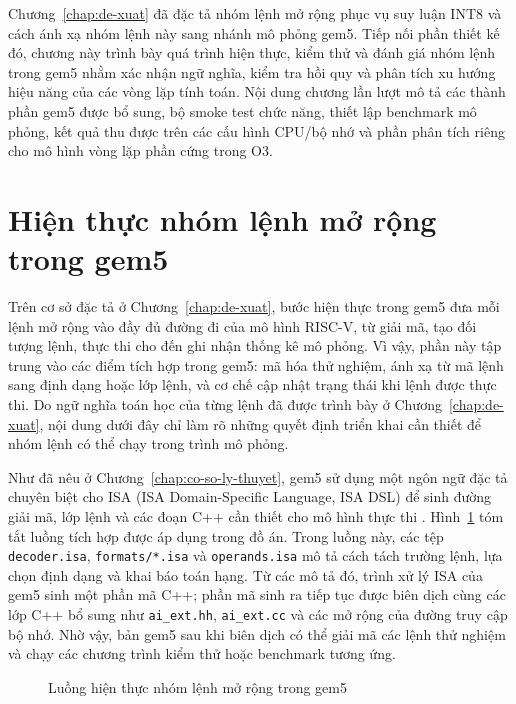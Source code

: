 \documentclass[../DoAn.tex]{subfiles}
\begin{document}
Chương~\ref{chap:de-xuat} đã đặc tả nhóm lệnh mở rộng phục vụ suy luận INT8 và cách ánh xạ nhóm lệnh này sang nhánh mô phỏng gem5. Tiếp nối phần thiết kế đó, chương này trình bày quá trình hiện thực, kiểm thử và đánh giá nhóm lệnh trong gem5 nhằm xác nhận ngữ nghĩa, kiểm tra hồi quy và phân tích xu hướng hiệu năng của các vòng lặp tính toán. Nội dung chương lần lượt mô tả các thành phần gem5 được bổ sung, bộ smoke test chức năng, thiết lập benchmark mô phỏng, kết quả thu được trên các cấu hình CPU/bộ nhớ và phần phân tích riêng cho mô hình vòng lặp phần cứng trong O3.

\section{Hiện thực nhóm lệnh mở rộng trong gem5}
\label{sec:hien-thuc-gem5}

Trên cơ sở đặc tả ở Chương~\ref{chap:de-xuat}, bước hiện thực trong gem5 đưa mỗi lệnh mở rộng vào đầy đủ đường đi của mô hình RISC-V, từ giải mã, tạo đối tượng lệnh, thực thi cho đến ghi nhận thống kê mô phỏng. Vì vậy, phần này tập trung vào các điểm tích hợp trong gem5: mã hóa thử nghiệm, ánh xạ từ mã lệnh sang định dạng hoặc lớp lệnh, và cơ chế cập nhật trạng thái khi lệnh được thực thi. Do ngữ nghĩa toán học của từng lệnh đã được trình bày ở Chương~\ref{chap:de-xuat}, nội dung dưới đây chỉ làm rõ những quyết định triển khai cần thiết để nhóm lệnh có thể chạy trong trình mô phỏng.

Như đã nêu ở Chương~\ref{chap:co-so-ly-thuyet}, gem5 sử dụng một ngôn ngữ đặc tả chuyên biệt cho ISA (ISA Domain-Specific Language, ISA DSL) để sinh đường giải mã, lớp lệnh và các đoạn C++ cần thiết cho mô hình thực thi \cite{gem5_docs_2026}. Hình~\ref{fig:gem5-ai-ext-implementation} tóm tắt luồng tích hợp được áp dụng trong đồ án. Trong luồng này, các tệp \texttt{decoder.isa}, \texttt{formats/*.isa} và \texttt{operands.isa} mô tả cách tách trường lệnh, lựa chọn định dạng và khai báo toán hạng. Từ các mô tả đó, trình xử lý ISA của gem5 sinh một phần mã C++; phần mã sinh ra tiếp tục được biên dịch cùng các lớp C++ bổ sung như \texttt{ai\_ext.hh}, \texttt{ai\_ext.cc} và các mở rộng của đường truy cập bộ nhớ. Nhờ vậy, bản gem5 sau khi biên dịch có thể giải mã các lệnh thử nghiệm và chạy các chương trình kiểm thử hoặc benchmark tương ứng.

\begin{figure}[H]
    \centering
    
    \caption{Luồng hiện thực nhóm lệnh mở rộng trong gem5}
    \label{fig:gem5-ai-ext-implementation}
\end{figure}
\end{document}
